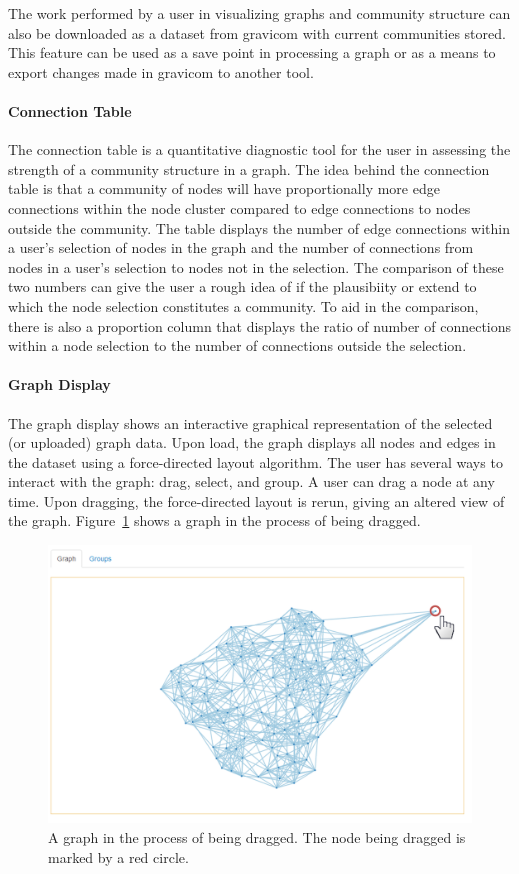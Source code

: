 \documentclass{article}\usepackage[]{graphicx}\usepackage[]{color}
\begin{document}
The work performed by a user in visualizing graphs and community structure can also be downloaded as a dataset from gravicom with current communities stored. This feature can be used as a save point in processing a graph or as a means to export changes made in gravicom to another tool.

\paragraph{Connection Table}
The connection table is a quantitative diagnostic tool for the user in assessing the strength of a community structure in a graph. The idea behind the connection table is that a community of nodes will have proportionally more edge connections within the node cluster compared to edge connections to nodes outside the community. The table displays the number of edge connections within a user's selection of nodes in the graph and the number of connections from nodes in a user's selection to nodes not in the selection. The comparison of these two numbers can give the user a rough idea of if the plausibiity or extend to which the node selection constitutes a community. To aid in the comparison, there is also a proportion column that displays the ratio of number of connections within a node selection to the number of connections outside the selection. 

\paragraph{Graph Display} \label{par:graph}
The graph display shows an interactive graphical representation of  the selected (or uploaded) graph data. Upon load, the graph displays all nodes and edges in the dataset using a force-directed layout algorithm. The user has several ways to interact with the graph: drag, select, and group. A user can drag a node at any time. Upon dragging, the force-directed layout is  rerun, giving an altered view of the graph. Figure~\ref{fig:graphdrag} shows a graph in the process of being dragged.

\begin{figure}[H]
\centering
\includegraphics[width=\textwidth]{images/graphdrag.png}
\caption{\label{fig:graphdrag} A graph in the process of being dragged. The node being dragged is marked by a red circle.}
\end{figure}
\end{document}
